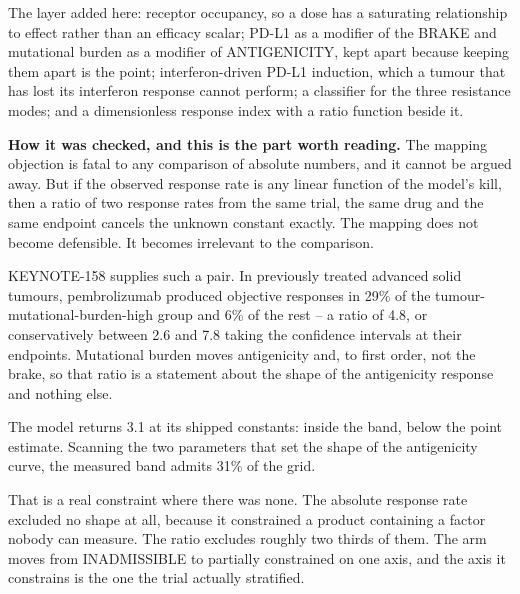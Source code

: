 \documentclass[11pt,twoside,openright]{report}
\begin{document}
\begin{numbers}
The layer added here: receptor occupancy, so a dose has a saturating relationship to effect rather than an efficacy scalar; PD-L1 as a modifier of the BRAKE and mutational burden as a modifier of ANTIGENICITY, kept apart because keeping them apart is the point; interferon-driven PD-L1 induction, which a tumour that has lost its interferon response cannot perform; a classifier for the three resistance modes; and a dimensionless response index with a ratio function beside it.
\end{numbers}

\textbf{How it was checked, and this is the part worth reading.} The mapping objection is fatal to any comparison of absolute numbers, and it cannot be argued away. But if the observed response rate is any linear function of the model's kill, then a ratio of two response rates from the same trial, the same drug and the same endpoint cancels the unknown constant exactly. The mapping does not become defensible. It becomes irrelevant to the comparison.

KEYNOTE-158 supplies such a pair. In previously treated advanced solid tumours, pembrolizumab produced objective responses in 29\% of the tumour-mutational-burden-high group and 6\% of the rest -- a ratio of 4.8, or conservatively between 2.6 and 7.8 taking the confidence intervals at their endpoints. Mutational burden moves antigenicity and, to first order, not the brake, so that ratio is a statement about the shape of the antigenicity response and nothing else.

\begin{finding}
The model returns 3.1 at its shipped constants: inside the band, below the point estimate. Scanning the two parameters that set the shape of the antigenicity curve, the measured band admits 31\% of the grid.

That is a real constraint where there was none. The absolute response rate excluded no shape at all, because it constrained a product containing a factor nobody can measure. The ratio excludes roughly two thirds of them. The arm moves from INADMISSIBLE to partially constrained on one axis, and the axis it constrains is the one the trial actually stratified.
\end{finding}
\end{document}

